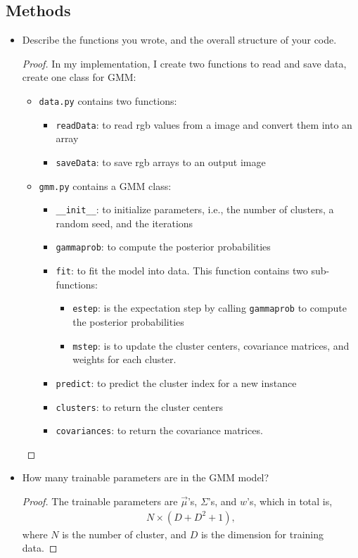 \documentclass[12pt]{article}
\newcommand{\1}{\mathbf{1}}
\begin{document}
{\subsection{Methods}
\begin{itemize}
  \item Describe the functions you wrote, and the overall structure of your code.
  \begin{proof}
    In my implementation, I create two functions to read and save data, create one class for GMM:
    \begin{itemize}
      \item {\tt data.py} contains two functions:
      \begin{itemize}
        \item {\tt readData}: to read rgb values from a image and convert them into an array
        \item {\tt saveData}: to save rgb arrays to an output image
      \end{itemize}
      \item {\tt gmm.py} contains a GMM class:
      \begin{itemize}
        \item {\tt \_\_init\_\_}: to initialize parameters, i.e., the number of clusters, a random seed, and the iterations
        \item {\tt gammaprob}: to compute the posterior probabilities
        \item {\tt fit}: to fit the model into data. This function contains two sub-functions:
        \begin{itemize}
          \item {\tt estep}: is the expectation step by calling {\tt gammaprob} to compute the posterior probabilities
          \item {\tt mstep}: is to update the cluster centers, covariance matrices, and weights for each cluster.
        \end{itemize}
        \item {\tt predict}: to predict the cluster index for a new instance
        \item {\tt clusters}: to return the cluster centers
        \item {\tt covariances}: to return the covariance matrices.
      \end{itemize}
    \end{itemize}
  \end{proof}
  \item How many trainable parameters are in the GMM model?
  \begin{proof}
    The trainable parameters are $\vec{\mu}$'s, $\Sigma$'s, and $w$'s, which in total is,
    \begin{align*}
      N \times ( D + D^2 + 1),
    \end{align*}
    where $N$ is the number of cluster, and $D$ is the dimension for training data.
  \end{proof}
\end{itemize}

}
\end{document}
